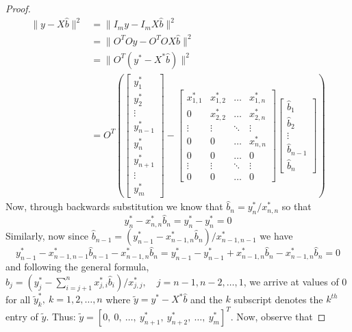 \documentclass[12pt]{article}
\begin{document}
		\begin{proof}
			\begin{align*}
				\|y-X \hat{b}\|^{2} &= \|I_m y- I_m X \hat{b}\|^{2} \\
				&= \|O^T O y-O^T O X \hat{b}\|^{2} \\
				&= \|O^T(y^*-X^* \hat{b})\|^{2} \\
				&= O^T \left( \begin{bmatrix}
					y_1^* \\ y_2^* \\ \vdots \\ y_{n-1}^* \\ y_n^* \\ y_{n+1}^* \\ \vdots \\ y_{m}^*
				\end{bmatrix} - \begin{bmatrix}
					x_{1,1}^* & x_{1,2}^* & \dots & x_{1,n}^* \\
					0 & x_{2,2}^* & \dots &x_{2,n}^* \\
					\vdots & \vdots & \ddots & \vdots \\
					0 & 0 & \dots & x_{n,n}^*\\
					0 & 0 & \dots & 0 \\
					\vdots & \vdots & \ddots & \vdots \\
					0 & 0 & \dots & 0
				\end{bmatrix} \begin{bmatrix}
					\hat{b}_1 \\ \hat{b}_2 \\ \vdots \\ \hat{b}_{n-1} \\ \hat{b}_{n} \end{bmatrix} \right)
			\end{align*}
		Now, through backwards substitution we know that $ \hat{b}_n=y_n^*/x_{n,n}^* $ so that \[ y_n^*-x_{n,n}^*\hat{b}_n = y_n^* -y_n^* = 0  \]
		Similarly, now since $ \hat{b}_{n-1}= \left(y_{n-1}^{*}-x_{n-1, n}^{*} \hat{b}_{n}\right) / x_{n-1, n-1}^{*}$  we have 
		\[ y_{n-1}^*-x_{n-1,n-1}^*\hat{b}_{n-1}-x_{n-1,n}^*\hat{b}_n = y_{n-1}^*-y_{n-1}^*+x_{n-1,n}^*\hat{b}_n-x_{n-1,n}^*\hat{b}_n=0 \]
		and following the general formula, $\hat{b}_{j}=\left(y_{j}^{*}-\sum_{i=j+1}^{n} x_{j, i}^{*} \hat{b}_{i}\right) / x_{j, j}^{*}, \quad j=n-1, n-2, \ldots, 1$, we arrive at values of 0 for all $ \tilde{y}_k^*,\ k=1,2,\dots,n $ where $ \tilde{y}=y^*-X^* \hat{b} $ and the $ k $ subscript denotes the $ k^{th} $ entry of $ \tilde{y} $. Thus: $ \tilde{y} = [ 0,\ 0,\ \dots,\ y_{n+1}^*,\ y_{n+2}^*,\ \dots,\  y_{m}^* ]^T $. Now, observe that 

\end{proof}
\end{document}
